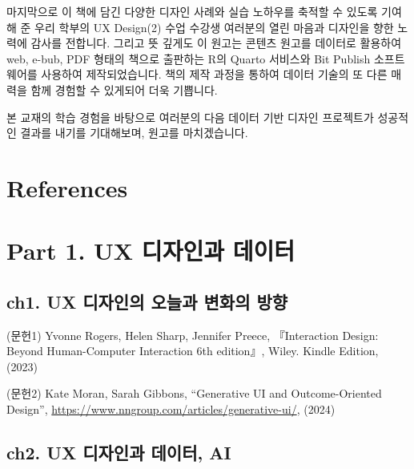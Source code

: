 \documentclass[
  letterpaper,
]{book}
\begin{document}
마지막으로 이 책에 담긴 다양한 디자인 사례와 실습 노하우를 축적할 수
있도록 기여해 준 우리 학부의 UX Design(2) 수업 수강생 여러분의 열린
마음과 디자인을 향한 노력에 감사를 전합니다. 그리고 뜻 깊게도 이 원고는
콘텐츠 원고를 데이터로 활용하여 web, e-bub, PDF 형태의 책으로 출판하는
R의 Quarto 서비스와 Bit Publish 소프트웨어를 사용하여 제작되었습니다.
책의 제작 과정을 통하여 데이터 기술의 또 다른 매력을 함께 경험할 수
있게되어 더욱 기쁩니다.

본 교재의 학습 경험을 바탕으로 여러분의 다음 데이터 기반 디자인
프로젝트가 성공적인 결과를 내기를 기대해보며, 원고를 마치겠습니다.


\chapter*{References}\label{references}



\chapter*{Part 1. UX 디자인과
데이터}\label{part-1.-ux-uxb514uxc790uxc778uxacfc-uxb370uxc774uxd130-2}


\section*{ch1. UX 디자인의 오늘과 변화의
방향}\label{ch1.-ux-uxb514uxc790uxc778uxc758-uxc624uxb298uxacfc-uxbcc0uxd654uxc758-uxbc29uxd5a5-1}


(문헌1) Yvonne Rogers, Helen Sharp, Jennifer Preece, 『Interaction
Design: Beyond Human-Computer Interaction 6th edition』, Wiley. Kindle
Edition, (2023)

(문헌2) Kate Moran, Sarah Gibbons, ``Generative UI and Outcome-Oriented
Design'', \url{https://www.nngroup.com/articles/generative-ui/}, (2024)

\section*{ch2. UX 디자인과 데이터,
AI}\label{ch2.-ux-uxb514uxc790uxc778uxacfc-uxb370uxc774uxd130-ai-1}
\end{document}
